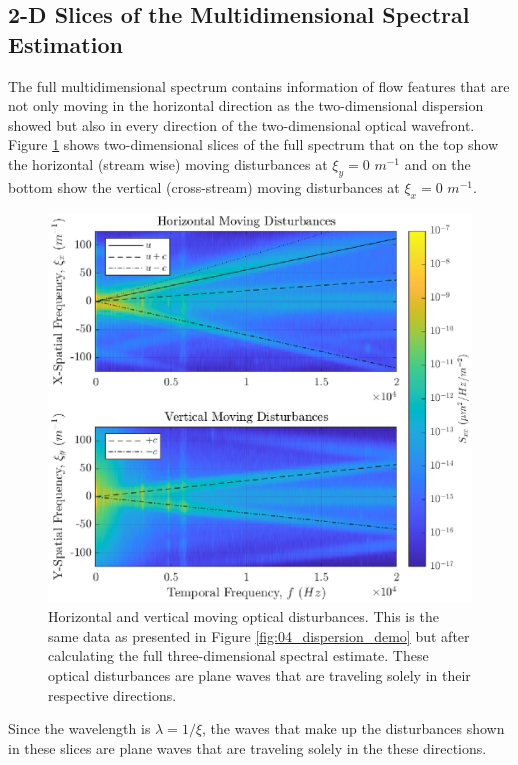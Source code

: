 \subsection{2-D Slices of the Multidimensional Spectral Estimation}
The full multidimensional spectrum contains information of flow features that are not only moving in the horizontal direction as the two-dimensional dispersion showed but also in every direction of the two-dimensional optical wavefront.
Figure \ref{fig:04_dispersion_xy} shows two-dimensional slices of the full spectrum that on the top show the horizontal (stream wise) moving disturbances at $\xi_y=0$ $m^{-1}$ and on the bottom show the vertical (cross-stream) moving disturbances at $\xi_x=0$ $m^{-1}$.
\begin{figure}
  \centering
  \includegraphics{../matlab/04_dispersion_analysis/dispersion_xy.eps}
  \caption{Horizontal and vertical moving optical disturbances. This is the same data as presented in Figure \ref{fig:04_dispersion_demo} but after calculating the full three-dimensional spectral estimate. These optical disturbances are plane waves that are traveling solely in their respective directions.}
  \label{fig:04_dispersion_xy}
\end{figure}
Since the wavelength is $\lambda=1/\xi$, the waves that make up the disturbances shown in these slices are plane waves that are traveling solely in the these directions.

